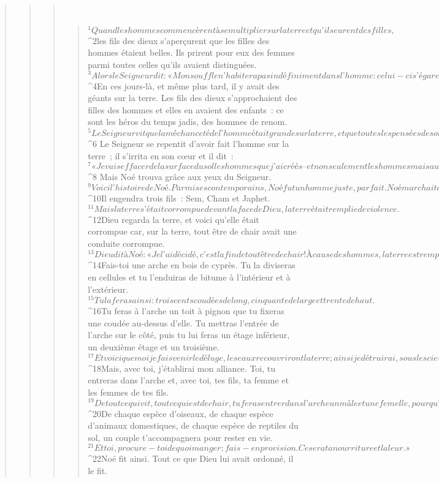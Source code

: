 \begin{verse}
\begin{verse}
\begin{verse}
         
      \bchapter{}
      \begin{verse}
${}^{1}Quand les hommes commencèrent à se multiplier sur la terre et qu’ils eurent des filles, 
${}^{2}les fils des dieux s’aperçurent que les filles des hommes étaient belles. Ils prirent pour eux des femmes parmi toutes celles qu’ils avaient distinguées. 
${}^{3}Alors le Seigneur dit : « Mon souffle n’habitera pas indéfiniment dans l’homme : celui-ci s’égare, il n’est qu’un être de chair, sa vie ne durera que cent vingt ans. »
${}^{4}En ces jours-là, et même plus tard, il y avait des géants sur la terre. Les fils des dieux s’approchaient des filles des hommes et elles en avaient des enfants : ce sont les héros du temps jadis, des hommes de renom.
${}^{5}Le Seigneur vit que la méchanceté de l’homme était grande sur la terre, et que toutes les pensées de son cœur se portaient uniquement vers le mal à longueur de journée. 
${}^{6} Le Seigneur se repentit d’avoir fait l’homme sur la terre ; il s’irrita en son cœur et il dit : 
${}^{7} « Je vais effacer de la surface du sol les hommes que j’ai créés – et non seulement les hommes mais aussi les bestiaux, les bestioles et les oiseaux du ciel – car je me repens de les avoir faits. » 
${}^{8} Mais Noé trouva grâce aux yeux du Seigneur.
${}^{9}Voici l’histoire de Noé. Parmi ses contemporains, Noé fut un homme juste, parfait. Noé marchait avec Dieu. 
${}^{10}Il engendra trois fils : Sem, Cham et Japhet. 
${}^{11}Mais la terre s’était corrompue devant la face de Dieu, la terre était remplie de violence. 
${}^{12}Dieu regarda la terre, et voici qu’elle était corrompue car, sur la terre, tout être de chair avait une conduite corrompue.
${}^{13}Dieu dit à Noé : « Je l’ai décidé, c’est la fin de tout être de chair ! À cause des hommes, la terre est remplie de violence. Eh bien ! je vais les détruire et la terre avec eux. 
${}^{14}Fais-toi une arche en bois de cyprès. Tu la diviseras en cellules et tu l’enduiras de bitume à l’intérieur et à l’extérieur. 
${}^{15}Tu la feras ainsi : trois cents coudées de long, cinquante de large et trente de haut. 
${}^{16}Tu feras à l’arche un toit à pignon que tu fixeras une coudée au-dessus d’elle. Tu mettras l’entrée de l’arche sur le côté, puis tu lui feras un étage inférieur, un deuxième étage et un troisième.
${}^{17}Et voici que moi je fais venir le déluge, les eaux recouvriront la terre ; ainsi je détruirai, sous les cieux, tout être de chair animé d’un souffle de vie. Tout ce qui vit sur la terre expirera. 
${}^{18}Mais, avec toi, j’établirai mon alliance. Toi, tu entreras dans l’arche et, avec toi, tes fils, ta femme et les femmes de tes fils. 
${}^{19}De tout ce qui vit, tout ce qui est de chair, tu feras entrer dans l’arche un mâle et une femelle, pour qu’ils restent en vie avec toi. 
${}^{20}De chaque espèce d’oiseaux, de chaque espèce d’animaux domestiques, de chaque espèce de reptiles du sol, un couple t’accompagnera pour rester en vie. 
${}^{21}Et toi, procure-toi de quoi manger ; fais-en provision. Ce sera ta nourriture et la leur. »
${}^{22}Noé fit ainsi. Tout ce que Dieu lui avait ordonné, il le fit.
      

\end{verse}
\end{verse}
\end{verse}
\end{verse}
